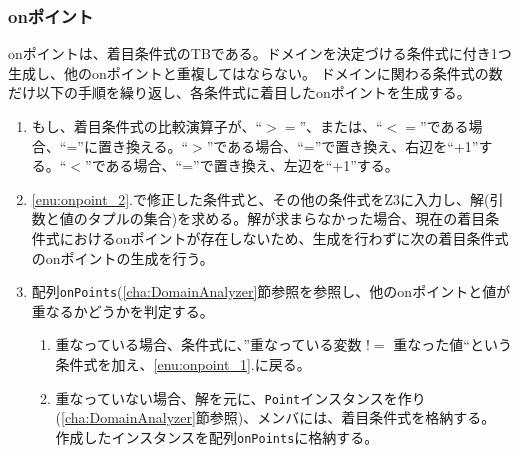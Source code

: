 \documentclass[uplatex, report, a4j, 10pt]{jsbook}
\newcommand\ttt[1]{\texttt{#1}}
\begin{document}
\subsubsection{onポイント}
onポイントは、着目条件式のTBである。ドメインを決定づける条件式に付き1つ生成し、他のonポイントと重複してはならない。
ドメインに関わる条件式の数だけ以下の手順を繰り返し、各条件式に着目したonポイントを生成する。
\begin{enumerate}
  \item\label{enu:onpoint_2} もし、着目条件式の比較演算子が、“$>=$”、または、“$<=$”である場合、“=”に置き換える。“$>$”である場合、“=”で置き換え、右辺を“+1”する。“$<$”である場合、“=”で置き換え、左辺を“+1”する。
  \item\label{enu:onpoint_1} \ref{enu:onpoint_2}.で修正した条件式と、その他の条件式をZ3に入力し、解(引数と値のタプルの集合)を求める。解が求まらなかった場合、現在の着目条件式におけるonポイントが存在しないため、生成を行わずに次の着目条件式のonポイントの生成を行う。
  \item 配列\ttt{onPoints}(\ref{cha:DomainAnalyzer}節参照を参照し、他のonポイントと値が重なるかどうかを判定する。
        \begin{enumerate}
          \item 重なっている場合、条件式に、”重なっている変数 $!=$ 重なった値“という条件式を加え、\ref{enu:onpoint_1}.に戻る。
          \item 重なっていない場合、解を元に、\ttt{Point}インスタンスを作り(\ref{cha:DomainAnalyzer}節参照)、メンバ\forcusedConditionalExpression{}には、着目条件式を格納する。
                作成したインスタンスを配列\ttt{onPoints}に格納する。
        \end{enumerate}
\end{enumerate}
\end{document}

